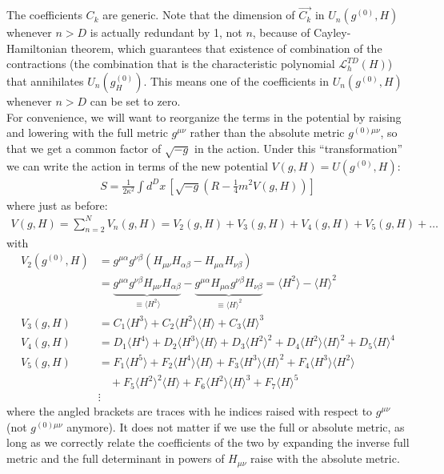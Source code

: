 \documentclass{book}
\theoremstyle{definition}
\newcommand{\lag}{\mathcal{L}}
\newcommand{\nn}{\nonumber}
\newcommand{\f}[2]{\frac{#1}{#2}}
\newcommand{\lp}{\left(}
\newcommand{\rp}{\right)}
\newcommand{\lb}{\left[}
\newcommand{\rb}{\right]}
\begin{document}
The coefficients $C_k$ are generic. Note that the dimension of $\vec{C_k}$ in $U_n(g^{(0)},H)$ whenever $n>D$ is actually redundant by 1, not $n$, because of Cayley-Hamiltonian theorem, which guarantees that existence of combination of the contractions (the combination that is the characteristic polynomial $\lag_h^{TD}(H)$) that annihilates $U_n(g^{(0)}_H)$. This means one of the coefficients in $U_n(g^{(0)},H)$ whenever $n>D$ can be set to zero. \\


For convenience, we will want to reorganize the terms in the potential by raising and lowering with the full metric $g^{\mu\nu}$ rather than the absolute metric $g^{(0)\mu\nu}$, so that we get a common factor of $\sqrt{-g}$ in the action. Under this ``transformation'' we can write the action in terms of the new potential $V(g,H) = U(g^{(0)},H)$:
\begin{align}
\boxed{S = \f{1}{2\kappa^2}\int d^Dx\, \lb \sqrt{-g}\lp R - \f{1}{4}m^2 V(g,H) \rp \rb}
\end{align}
where just as before:
\begin{align}
\boxed{V(g,H) = \sum^N_{n=2}V_n(g,H) = V_2(g,H) + V_3(g,H) + V_4(g,H) + V_5(g,H) + \dots}
\end{align}
with 
\begin{align}
V_2(g^{(0)},H) &= g^{\mu\alpha}g^{\nu\beta}\lp H_{\mu\nu}H_{\alpha\beta} - H_{\mu\alpha}H_{\nu\beta} \rp   \nn\\
&= \underbrace{g^{\mu\alpha}g^{\nu\beta}H_{\mu\nu}H_{\alpha\beta}}_{\equiv \langle H^2\rangle } - \underbrace{g^{\mu\alpha}H_{\mu\alpha}g^{\nu\beta}H_{\nu\beta}}_{\equiv \langle H \rangle ^2}= \langle H^2\rangle  - \langle H\rangle ^2\nn\\
V_3(g,H) &= C_1\langle H^3 \rangle  + C_2\langle H^2\rangle \langle H\rangle + C_3\langle H\rangle^3\nn\\
V_4(g,H) &= D_1\langle H^4\rangle  + D_2\langle H^3\rangle \langle H\rangle + D_3\langle H^2\rangle^2 + D_4\langle H^2\rangle\langle H\rangle^2 + D_5\langle H\rangle^4\nn\\
V_5(g,H) &= F_1\langle H^5\rangle  + F_2\langle H^4\rangle\langle H\rangle + F_3\langle H^3\rangle \langle H\rangle^2 + F_4\langle H^3\rangle\langle H^2\rangle\nn\\ &\,\,\,\,\,\,+ F_5\langle H^2\rangle^2\langle H\rangle + F_6\langle H^2\rangle\langle H\rangle^3 + F_7\langle H\rangle^5\nn\\
&\vdots
\end{align}
where the angled brackets are traces with he indices raised with respect to $g^{\mu\nu}$ (not $g^{(0)\mu\nu}$ anymore). It does not matter if we use the full or absolute metric, as long as we correctly relate the coefficients of the two by expanding the inverse full metric and the full determinant in powers of $H_{\mu\nu}$ raise with the absolute metric. \\
\end{document}
